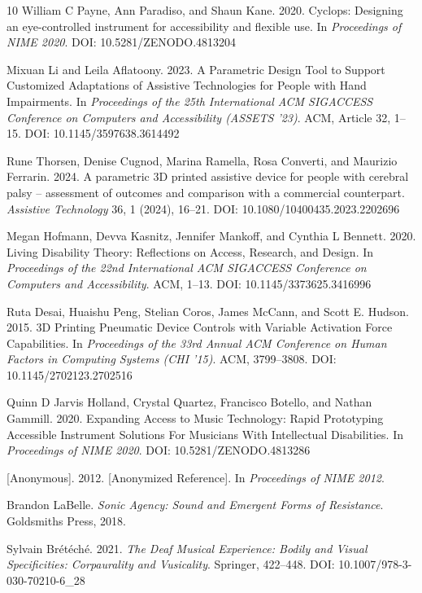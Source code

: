 \documentclass[manuscript,screen,review,anonymous]{acmart}
\begin{document}
\begin{thebibliography}{10}
William C Payne, Ann Paradiso, and Shaun Kane. 2020.
Cyclops: Designing an eye-controlled instrument for accessibility and flexible use.
In \textit{Proceedings of NIME 2020}.
DOI: 10.5281/ZENODO.4813204

Mixuan Li and Leila Aflatoony. 2023.
A Parametric Design Tool to Support Customized Adaptations of Assistive Technologies for People with Hand Impairments.
In \textit{Proceedings of the 25th International ACM SIGACCESS Conference on Computers and Accessibility (ASSETS '23)}.
ACM, Article 32, 1--15.
DOI: 10.1145/3597638.3614492

Rune Thorsen, Denise Cugnod, Marina Ramella, Rosa Converti, and Maurizio Ferrarin. 2024.
A parametric 3D printed assistive device for people with cerebral palsy -- assessment of outcomes and comparison with a commercial counterpart.
\textit{Assistive Technology} 36, 1 (2024), 16--21.
DOI: 10.1080/10400435.2023.2202696

Megan Hofmann, Devva Kasnitz, Jennifer Mankoff, and Cynthia L Bennett. 2020.
Living Disability Theory: Reflections on Access, Research, and Design.
In \textit{Proceedings of the 22nd International ACM SIGACCESS Conference on Computers and Accessibility}.
ACM, 1--13.
DOI: 10.1145/3373625.3416996

Ruta Desai, Huaishu Peng, Stelian Coros, James McCann, and Scott E. Hudson. 2015.
3D Printing Pneumatic Device Controls with Variable Activation Force Capabilities.
In \textit{Proceedings of the 33rd Annual ACM Conference on Human Factors in Computing Systems (CHI '15)}.
ACM, 3799--3808.
DOI: 10.1145/2702123.2702516

Quinn D Jarvis Holland, Crystal Quartez, Francisco Botello, and Nathan Gammill. 2020.
Expanding Access to Music Technology: Rapid Prototyping Accessible Instrument Solutions For Musicians With Intellectual Disabilities.
In \textit{Proceedings of NIME 2020}.
DOI: 10.5281/ZENODO.4813286

[Anonymous]. 2012.
[Anonymized Reference].
In \textit{Proceedings of NIME 2012}.

Brandon LaBelle.
\textit{Sonic Agency: Sound and Emergent Forms of Resistance}.
Goldsmiths Press, 2018.

Sylvain Br\'{e}t\'{e}ch\'{e}. 2021.
\textit{The Deaf Musical Experience: Bodily and Visual Specificities: Corpaurality and Vusicality}.
Springer, 422--448.
DOI: 10.1007/978-3-030-70210-6\_28


\end{thebibliography}
\end{document}
